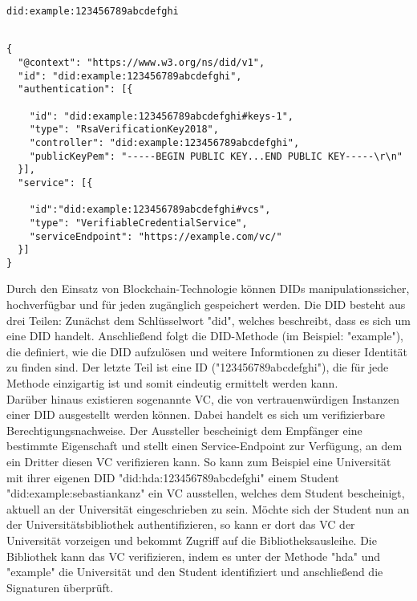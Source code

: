 \begin{lstlisting}[caption=Beispiel einer DID,label=listing:did]
did:example:123456789abcdefghi
\end{lstlisting}

\begin{lstlisting}[caption=Beispiel eines DID-Dokuments,label=listing:did_document]

{
  "@context": "https://www.w3.org/ns/did/v1",
  "id": "did:example:123456789abcdefghi",
  "authentication": [{

    "id": "did:example:123456789abcdefghi#keys-1",
    "type": "RsaVerificationKey2018",
    "controller": "did:example:123456789abcdefghi",
    "publicKeyPem": "-----BEGIN PUBLIC KEY...END PUBLIC KEY-----\r\n"
  }],
  "service": [{

    "id":"did:example:123456789abcdefghi#vcs",
    "type": "VerifiableCredentialService",
    "serviceEndpoint": "https://example.com/vc/"
  }]
}
\end{lstlisting}

Durch den Einsatz von Blockchain-Technologie können \ac{DID}s manipulationssicher, hochverfügbar und für jeden zugänglich gespeichert werden. Die \ac{DID} besteht aus drei Teilen: Zunächst dem Schlüsselwort "did", welches beschreibt, dass es sich um eine \ac{DID} handelt. Anschließend folgt die DID-Methode (im Beispiel: "example"), die definiert, wie die \ac{DID} aufzulösen und weitere Informtionen zu dieser Identität zu finden sind. Der letzte Teil ist eine ID ("123456789abcdefghi"), die für jede Methode einzigartig ist und somit eindeutig ermittelt werden kann.\\
Darüber hinaus existieren sogenannte \ac{VC}, die von vertrauenwürdigen Instanzen einer \ac{DID} ausgestellt werden können. Dabei handelt es sich um verifizierbare Berechtigungsnachweise. Der Aussteller bescheinigt dem Empfänger eine bestimmte Eigenschaft und stellt einen Service-Endpoint zur Verfügung, an dem ein Dritter diesen \ac{VC} verifizieren kann. So kann zum Beispiel eine Universität mit ihrer eigenen \ac{DID} "did:hda:123456789abcdefghi" einem Student "did:example:sebastiankanz" ein \ac{VC} ausstellen, welches dem Student bescheinigt, aktuell an der Universität eingeschrieben zu sein. Möchte sich der Student nun an der Universitätsbibliothek authentifizieren, so kann er dort das \ac{VC} der Universität vorzeigen und bekommt Zugriff auf die Bibliotheksausleihe. Die Bibliothek kann das \ac{VC} verifizieren, indem es unter der Methode "hda" und "example" die Universität und den Student identifiziert und anschließend die Signaturen überprüft.

